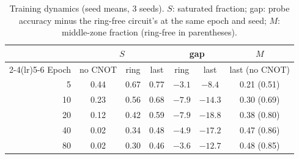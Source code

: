 \begin{table}[h]
\centering
\caption{Training dynamics (seed means, 3 seeds). $S$: saturated fraction; gap: probe accuracy
minus the ring-free circuit's at the same epoch and seed; $M$: middle-zone fraction (ring-free in
parentheses).}
\label{tab:dynamics}
\footnotesize
\setlength{\tabcolsep}{3pt}
\begin{tabular}{rcccccc}
\toprule
& \multicolumn{3}{c}{$S$} & \multicolumn{2}{c}{gap} & $M$ \\
\cmidrule(lr){2-4}\cmidrule(lr){5-6}
Epoch & no CNOT & ring & last & ring & last & last (no CNOT) \\
\midrule
5 & 0.44 & 0.67 & 0.77 & $-3.1$ & $-8.4$ & 0.21 (0.51) \\
10 & 0.23 & 0.56 & 0.68 & $-7.9$ & $-14.3$ & 0.30 (0.69) \\
20 & 0.12 & 0.42 & 0.59 & $-7.9$ & $-18.8$ & 0.38 (0.80) \\
40 & 0.02 & 0.34 & 0.48 & $-4.9$ & $-17.2$ & 0.47 (0.86) \\
80 & 0.02 & 0.30 & 0.46 & $-3.6$ & $-12.7$ & 0.48 (0.85) \\
\bottomrule
\end{tabular}
\end{table}

